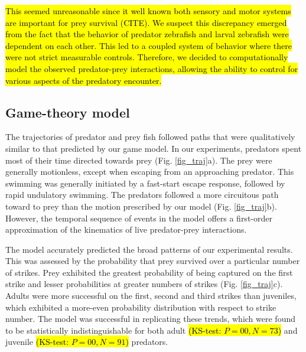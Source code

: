 \documentclass[]{rsos}%
\begin{document}
\hl{This seemed unreasonable since it well known both sensory and motor systems are important for prey survival (CITE). We suspect this discrepancy emerged from the fact that the behavior of predator zebrafish and larval zebrafish were dependent on each other. This led to a coupled system of behavior where there were not strict measurable controls. Therefore, we decided to computationally model the observed predator-prey interactions, allowing the ability to control for various aspects of the predatory encounter.}


\subsection{Game-theory model} %
The trajectories of predator and prey fish followed paths that were qualitatively similar to that predicted by our game model.
In our experiments, predators spent most of their time directed towards prey (Fig. \ref{fig_traj}a). 
The prey were generally motionless, except when escaping from an approaching predator.
This swimming was generally initiated by a fast-start escape response, followed by rapid undulatory swimming.
The predators followed a more circuitous path toward to prey than the motion prescribed by our model (Fig. \ref{fig_traj}b).
However, the temporal sequence of events in the model offers a first-order approximation of the kinematics of live predator-prey interactions.

The model accurately predicted the broad patterns of our experimental results.
This was assessed by the probability that prey survived over a particular number of strikes. 
Prey exhibited the greatest probability of being captured on the first strike and lesser probabilities at greater numbers of strikes (Fig. \ref{fig_traj}c).
Adults were more successful on the first, second and third strikes than juveniles, which exhibited a more-even probability distribution with respect to strike number.
The model was successful in replicating these trends, which were found to be statistically indistinguishable for both adult \hl{(KS-test: $P = 00, N = 73$)} and juvenile \hl{(KS-test: $P = 00, N = 91$)} predators.
\end{document}

